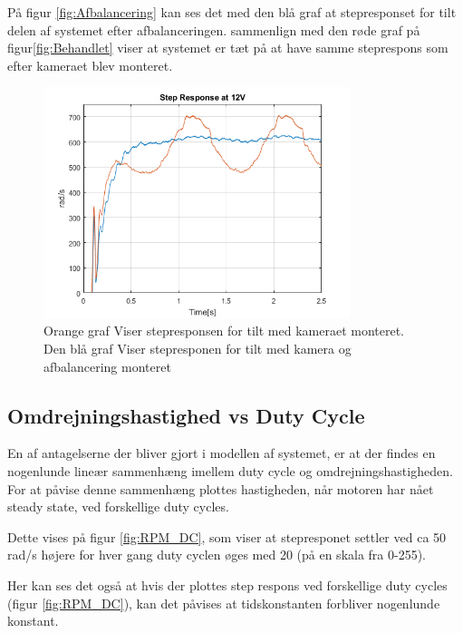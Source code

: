 På figur \ref{fig:Afbalancering} kan ses det med den blå graf at stepresponset for tilt delen af systemet efter afbalanceringen. sammenlign med den røde graf på figur\ref{fig:Behandlet} viser at systemet er tæt på at have samme steprespons som efter kameraet blev monteret.\\

\begin{figure}[ht]
	\begin{center}
		\includegraphics[width=0.8\textwidth]{Billeder/balanced_vs_unbalanced.png}
	\end{center}
	\caption{Orange graf Viser stepresponsen for tilt med kameraet monteret. Den blå graf Viser stepresponen for tilt med kamera og afbalancering monteret}
	\label{fig:Balanced_Response}
\end{figure}

\subsection{Omdrejningshastighed vs Duty Cycle}

En af antagelserne der bliver gjort i modellen af systemet, er at der findes en nogenlunde lineær sammenhæng imellem duty cycle og omdrejningshastigheden. For at påvise denne sammenhæng plottes hastigheden, når motoren har nået steady state, ved forskellige duty cycles. 

Dette vises på figur \ref{fig:RPM_DC}, som viser at stepresponet settler ved ca 50 rad/s højere for hver gang duty cyclen øges med 20 (på en skala fra 0-255).

Her kan ses det også at hvis der plottes step respons ved forskellige duty cycles (figur \ref{fig:RPM_DC}), kan det påvises at tidskonstanten forbliver nogenlunde konstant. 

